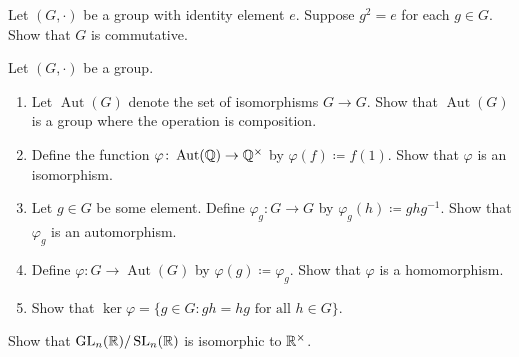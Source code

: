 \documentclass[../main.tex]{subfiles}
\begin{document}
\begin{homework}
    Let $(G,\cdot)$ be a group with identity element $e$. Suppose $g^2=e$ for each $g\in G$. Show that $G$ is commutative.
\end{homework}

\begin{homework}
    Let $(G,\cdot)$ be a group.
    \begin{enumerate}[label=(\alph*)]
        \item Let $\operatorname{Aut}(G)$ denote the set of isomorphisms $G\to G$. Show that $\operatorname{Aut}(G)$ is a group where the operation is composition.
        \item Define the function $\varphi\colon\operatorname{Aut}(\mathbb Q)\to\mathbb Q^\times$ by $\varphi(f)\coloneqq f(1)$. Show that $\varphi$ is an isomorphism.
        \item Let $g\in G$ be some element. Define $\varphi_g\colon G\to G$ by $\varphi_g(h)\coloneqq ghg^{-1}$. Show that $\varphi_g$ is an automorphism.
        \item Define $\varphi\colon G\to\operatorname{Aut}(G)$ by $\varphi(g)\coloneqq\varphi_g$. Show that $\varphi$ is a homomorphism.
        \item Show that $\ker\varphi=\{g\in G:gh=hg\text{ for all }h\in G\}$.
    \end{enumerate}
\end{homework}

\begin{homework}
    Show that $\operatorname{GL}_n(\mathbb R)/\operatorname{SL}_n(\mathbb R)$ is isomorphic to $\mathbb R^\times$.
\end{homework}
\end{document}
